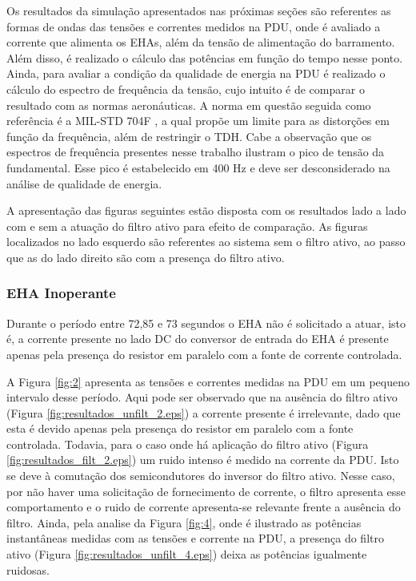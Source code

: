 Os resultados da simulação apresentados nas próximas seções são referentes as formas de ondas das tensões e correntes medidos na PDU, onde é avaliado a corrente que alimenta os EHAs, além da tensão de alimentação do barramento. Além disso, é realizado o cálculo das potências em função do tempo nesse ponto. Ainda, para avaliar a condição da qualidade de energia na PDU é realizado o cálculo do espectro de frequência da tensão, cujo intuito é de comparar o resultado com as normas aeronáuticas. A norma em questão seguida como referência é a MIL-STD 704F \cite{MILSTD}, a qual propõe um limite para as distorções em função da frequência, além de restringir o TDH. Cabe a observação que os espectros de frequência presentes nesse trabalho ilustram o pico de tensão da fundamental. Esse pico é estabelecido em 400 Hz e deve ser desconsiderado na análise de qualidade de energia.

A apresentação das figuras seguintes estão disposta com os resultados lado a lado com e sem a atuação do filtro ativo para efeito de comparação. As figuras localizados no lado esquerdo são referentes ao sistema sem o filtro ativo, ao passo que as do lado direito são com a presença do filtro ativo.

\subsubsection{EHA Inoperante}

Durante o período entre 72,85 e 73 segundos o EHA não é solicitado a atuar, isto é, a corrente presente no lado DC do conversor de entrada do EHA é presente apenas pela presença do resistor em paralelo com a fonte de corrente controlada. 

A Figura \ref{fig:2} apresenta as tensões e correntes medidas na PDU em um pequeno intervalo desse período. Aqui pode ser observado que na ausência do filtro ativo (Figura \ref{fig:resultados_unfilt_2.eps}) a corrente presente é irrelevante, dado que esta é devido apenas pela presença do resistor em paralelo com a fonte controlada. Todavia, para o caso onde há aplicação do filtro ativo (Figura \ref{fig:resultados_filt_2.eps}) um ruido intenso é medido na corrente da PDU. Isto se deve à comutação dos semicondutores do inversor do filtro ativo. Nesse caso, por não haver uma solicitação de fornecimento de corrente, o filtro apresenta esse comportamento e o ruido de corrente apresenta-se relevante frente a ausência do filtro. Ainda, pela analise da Figura \ref{fig:4}, onde é ilustrado as potências instantâneas medidas com as tensões e corrente na PDU, a presença do filtro ativo (Figura \ref{fig:resultados_unfilt_4.eps}) deixa as potências igualmente ruidosas.


